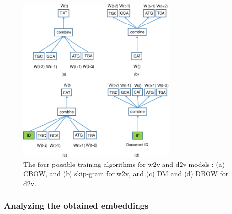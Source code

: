 \begin{figure}
	\includegraphics[width=0.7\textwidth]{../visualizations/ch4-methods/w2v_d2v_training_variants.png} 
	\caption{
		The four possible training algorithms for w2v and d2v models \cite{d2vsplicing}: (a) CBOW, and (b) skip-gram for w2v, and (c) DM and (d) DBOW for d2v. 
	}
	\label{fig:w2vd2vtrainingvariants}
\end{figure}

\subsubsection{Analyzing the obtained embeddings}

